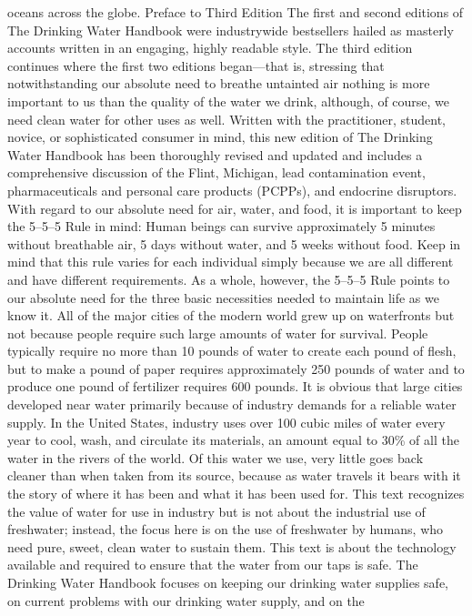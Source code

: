 \documentclass{article}
\begin{document}
oceans across the globe. Preface to Third Edition The first and second
editions of The Drinking Water Handbook were industrywide bestsellers
hailed as masterly accounts written in an engaging, highly readable
style. The third edition continues where the first two editions
began---that is, stressing that notwithstanding our absolute need to
breathe untainted air nothing is more important to us than the quality
of the water we drink, although, of course, we need clean water for
other uses as well. Written with the practitioner, student, novice, or
sophisticated consumer in mind, this new edition of The Drinking Water
Handbook has been thoroughly revised and updated and includes a
comprehensive discussion of the Flint, Michigan, lead contamination
event, pharmaceuticals and personal care products (PCPPs), and endocrine
disruptors. With regard to our absolute need for air, water, and food,
it is important to keep the 5--5--5 Rule in mind: Human beings can
survive approximately 5 minutes without breathable air, 5 days without
water, and 5 weeks without food. Keep in mind that this rule varies for
each individual simply because we are all different and have different
requirements. As a whole, however, the 5--5--5 Rule points to our
absolute need for the three basic necessities needed to maintain life as
we know it. All of the major cities of the modern world grew up on
waterfronts but not because people require such large amounts of water
for survival. People typically require no more than 10 pounds of water
to create each pound of flesh, but to make a pound of paper requires
approximately 250 pounds of water and to produce one pound of fertilizer
requires 600 pounds. It is obvious that large cities developed near
water primarily because of industry demands for a reliable water supply.
In the United States, industry uses over 100 cubic miles of water every
year to cool, wash, and circulate its materials, an amount equal to 30\%
of all the water in the rivers of the world. Of this water we use, very
little goes back cleaner than when taken from its source, because as
water travels it bears with it the story of where it has been and what
it has been used for. This text recognizes the value of water for use in
industry but is not about the industrial use of freshwater; instead, the
focus here is on the use of freshwater by humans, who need pure, sweet,
clean water to sustain them. This text is about the technology available
and required to ensure that the water from our taps is safe. The
Drinking Water Handbook focuses on keeping our drinking water supplies
safe, on current problems with our drinking water supply, and on the
\end{document}
